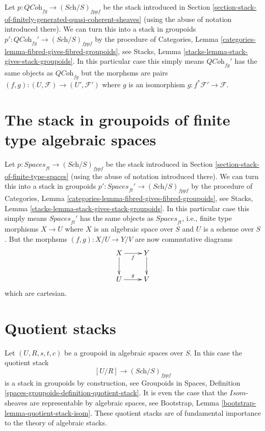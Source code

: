 \noindent
Let $p : \textit{QCoh}_{fg} \to (\textit{Sch}/S)_{fppf}$ be the stack
introduced in
Section \ref{section-stack-of-finitely-generated-quasi-coherent-sheaves}
(using the abuse of notation introduced there).
We can turn this into a stack in groupoids
$p' : \textit{QCoh}_{fg}' \to (\textit{Sch}/S)_{fppf}$ by
the procedure of
Categories, Lemma \ref{categories-lemma-fibred-gives-fibred-groupoids},
see
Stacks, Lemma \ref{stacks-lemma-stack-gives-stack-groupoids}.
In this particular case this simply means $\textit{QCoh}_{fg}'$ has
the same objects as $\textit{QCoh}_{fg}$ but the morphsms are
pairs $(f, g) : (U, \mathcal{F}) \to (U', \mathcal{F}')$
where $g$ is an isomorphism $g : f^*\mathcal{F}' \to \mathcal{F}$.


\section{The stack in groupoids of finite type algebraic spaces}
\label{section-stack-in-groupoids-of-finite-type-spaces}

\noindent
Let $p : \textit{Spaces}_{ft} \to (\textit{Sch}/S)_{fppf}$ be the stack
introduced in
Section \ref{section-stack-of-finite-type-spaces}
(using the abuse of notation introduced there).
We can turn this into a stack in groupoids
$p' : \textit{Spaces}_{ft}' \to (\textit{Sch}/S)_{fppf}$ by
the procedure of
Categories, Lemma \ref{categories-lemma-fibred-gives-fibred-groupoids},
see
Stacks, Lemma \ref{stacks-lemma-stack-gives-stack-groupoids}.
In this particular case this simply means $\textit{Spaces}_{ft}'$
has the same objects as $\textit{Spaces}_{ft}$, i.e., finite type morphisms
$X \to U$ where $X$ is an algebraic space over $S$ and $U$ is a scheme
over $S$. But the morphsms $(f, g) : X/U \to Y/V$ are now
commutative diagrams
$$
\xymatrix{
X \ar[d] \ar[r]_f & Y \ar[d] \\
U \ar[r]^g & V
}
$$
which are cartesian.



\section{Quotient stacks}
\label{section-quotient-stacks}

\noindent
Let $(U, R, s, t, c)$ be a groupoid in algebraic spaces over $S$.
In this case the quotient stack
$$
[U/R] \longrightarrow (\textit{Sch}/S)_{fppf}
$$
is a stack in groupoids by construction, see
Groupoids in Spaces,
Definition \ref{spaces-groupoids-definition-quotient-stack}.
It is even the case that the $\mathit{Isom}$-sheaves are
representable by algebraic spaces, see
Bootstrap, Lemma \ref{bootstrap-lemma-quotient-stack-isom}.
These quotient stacks are of fundamental importance to the theory of
algebraic stacks.

